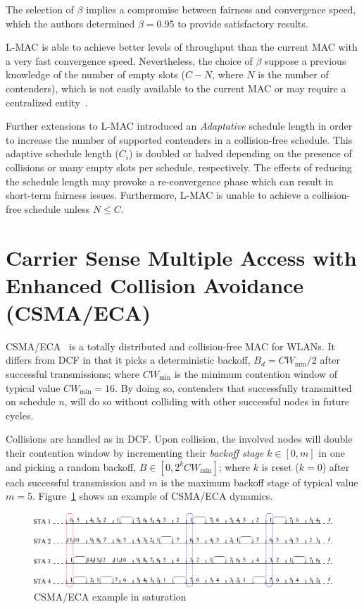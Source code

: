 \documentclass[a4paper,journal]{IEEEtran}
\begin{document}
The selection of $\beta$ implies a compromise between fairness and convergence speed, which the authors determined $\beta=0.95$ to provide satisfactory results.

L-MAC is able to achieve better levels of throughput than the current MAC with a very fast convergence speed. Nevertheless, the choice of $\beta$ suppose a previous knowledge of the number of empty slots ($C-N$, where $N$ is the number of contenders), which is not easily available to the current MAC or may require a centralized entity~\cite{barcelo2011tcf}.

Further extensions to L-MAC introduced an \emph{Adaptative} schedule length in order to increase the number of supported contenders in a collision-free schedule. This adaptive schedule length ($C_{i}$) is doubled or halved depending on the presence of collisions or many empty slots per schedule, respectively. The effects of reducing the schedule length may provoke a re-convergence phase which can result in short-term fairness issues. Furthermore, L-MAC is unable to achieve a collision-free schedule unless $N\leq C$.

\section{Carrier Sense Multiple Access with Enhanced Collision Avoidance (CSMA/ECA)}\label{introProtocol}
CSMA/ECA~\cite{barcelo2008lba} is a totally distributed and collision-free MAC for WLANs. It differs from DCF in that it picks a deterministic backoff, $B_{d}=CW_{\min}/2$ after successful transmissions; where $CW_{\min}$ is the minimum contention window of typical value $CW_{\min}=16$. By doing so, contenders that successfully transmitted on schedule $n$, will do so without colliding with other successful nodes in future cycles.

Collisions are handled as in DCF. Upon collision, the involved nodes will double their contention window by incrementing their \emph{backoff stage} $k\in[0,m]$ in one and picking a random backoff, $B\in[0,2^{k}CW_{\min}]$; where $k$ is reset ($k=0$) after each successful transmission and $m$ is the maximum backoff stage of typical value $m=5$. Figure~\ref{fig:BECA} shows an example of CSMA/ECA dynamics.

\begin{figure}[tbhp]
\centering
  \includegraphics[width=0.9\linewidth]{figures/basicECA.eps}
  \caption{CSMA/ECA example in saturation}
  \label{fig:BECA}
\end{figure}
\end{document}
